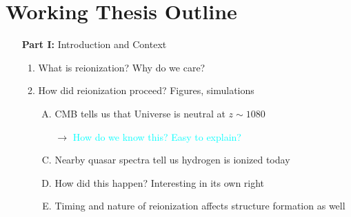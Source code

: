 \documentclass[11pt]{article}
\begin{document}
\section*{Working Thesis Outline}

\begin{enumerate}
\item [{\bf Part I:}] Introduction and Context
\begin{enumerate}[1.]

\item What is reionization? Why do we care?
\item How did reionization proceed? Figures, simulations
\begin{enumerate}[A.]
\item CMB tells us that Universe is neutral at $z \sim 1080$
\item [$\to$] \textcolor{cyan}{How do we know this? Easy to explain?}
\item Nearby quasar spectra tell us hydrogen is ionized today
\item How did this happen? Interesting in its own right
\item Timing and nature of reionization affects structure formation as well
\end{enumerate}



\end{enumerate}
\end{enumerate}
\end{document}

